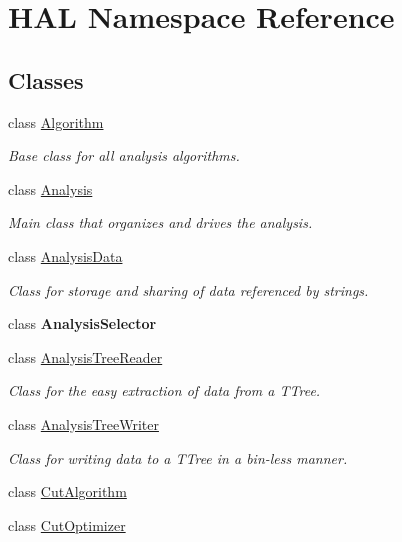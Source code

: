 \hypertarget{namespace_h_a_l}{\section{H\+A\+L Namespace Reference}
\label{namespace_h_a_l}
}
\subsection*{Classes}
\begin{DoxyCompactItemize}
\item 
class \hyperlink{class_h_a_l_1_1_algorithm}{Algorithm}
\begin{DoxyCompactList}\small\item\em Base class for all analysis algorithms. \end{DoxyCompactList}\item 
class \hyperlink{class_h_a_l_1_1_analysis}{Analysis}
\begin{DoxyCompactList}\small\item\em Main class that organizes and drives the analysis. \end{DoxyCompactList}\item 
class \hyperlink{class_h_a_l_1_1_analysis_data}{Analysis\+Data}
\begin{DoxyCompactList}\small\item\em Class for storage and sharing of data referenced by strings. \end{DoxyCompactList}\item 
class {\bfseries Analysis\+Selector}
\item 
class \hyperlink{class_h_a_l_1_1_analysis_tree_reader}{Analysis\+Tree\+Reader}
\begin{DoxyCompactList}\small\item\em Class for the easy extraction of data from a T\+Tree. \end{DoxyCompactList}\item 
class \hyperlink{class_h_a_l_1_1_analysis_tree_writer}{Analysis\+Tree\+Writer}
\begin{DoxyCompactList}\small\item\em Class for writing data to a T\+Tree in a bin-\/less manner. \end{DoxyCompactList}\item 
class \hyperlink{class_h_a_l_1_1_cut_algorithm}{Cut\+Algorithm}
\item 
class \hyperlink{class_h_a_l_1_1_cut_optimizer}{Cut\+Optimizer}
\item 

\end{DoxyCompactItemize}
